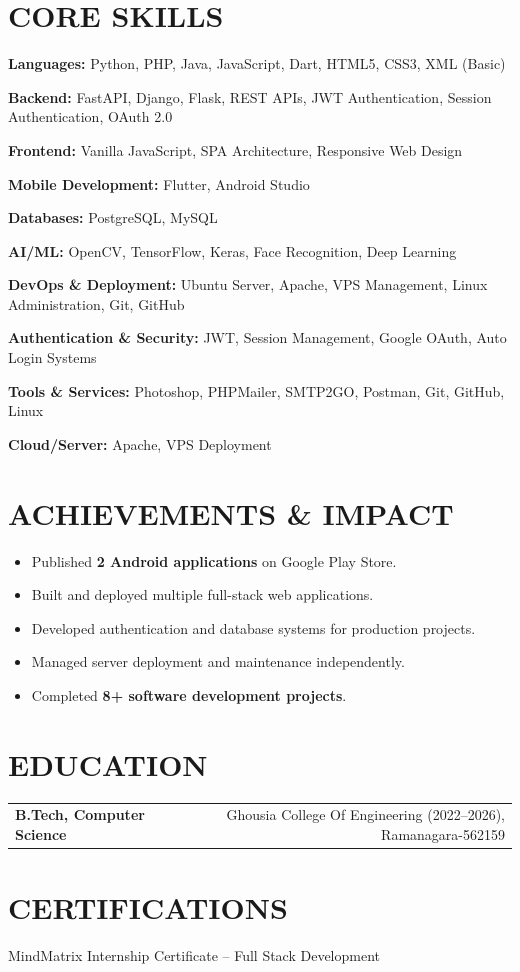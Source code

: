 \documentclass[10pt,a4paper]{article}
\begin{document}

\section*{CORE SKILLS}

\textbf{Languages:} Python, PHP, Java, JavaScript, Dart, HTML5, CSS3, XML (Basic)

\textbf{Backend:} FastAPI, Django, Flask, REST APIs, JWT Authentication, Session Authentication, OAuth 2.0

\textbf{Frontend:} Vanilla JavaScript, SPA Architecture, Responsive Web Design

\textbf{Mobile Development:} Flutter, Android Studio

\textbf{Databases:} PostgreSQL, MySQL

\textbf{AI/ML:} OpenCV, TensorFlow, Keras, Face Recognition, Deep Learning

\textbf{DevOps \& Deployment:} Ubuntu Server, Apache, VPS Management, Linux Administration, Git, GitHub

\textbf{Authentication \& Security:} JWT, Session Management, Google OAuth, Auto Login Systems

\textbf{Tools \& Services:} Photoshop, PHPMailer, SMTP2GO, Postman, Git, GitHub, Linux

\textbf{Cloud/Server:} Apache, VPS Deployment


\section*{ACHIEVEMENTS \& IMPACT}

\begin{itemize}
\item Published \textbf{2 Android applications} on Google Play Store.
\item Built and deployed multiple full-stack web applications.
\item Developed authentication and database systems for production projects.
\item Managed server deployment and maintenance independently.
\item Completed \textbf{8+ software development projects}.
\end{itemize}



\section*{EDUCATION}

\begin{tabularx}{\textwidth}{Xr}
\textbf{B.Tech, Computer Science}
&
Ghousia College Of Engineering (2022--2026), Ramanagara-562159
\end{tabularx}


\section*{CERTIFICATIONS}

MindMatrix Internship Certificate -- Full Stack Development
\end{document}

